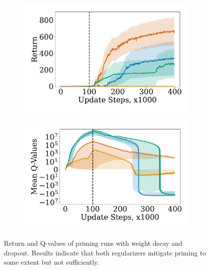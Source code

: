 \begin{figure}[b]
\begin{minipage}[b]{.62\textwidth}
    \begin{subfigure}[b]{0.5\textwidth}
        \centering
        \includegraphics[width=\textwidth]{figures/dissecting/priming/priming_ablations_return.pdf}
    \end{subfigure}%
    \begin{subfigure}[b]{0.5\textwidth}
    \centering
        \includegraphics[width=\textwidth]{figures/dissecting/priming/priming_ablations_Q.pdf}
    \end{subfigure}%
    \caption{Return and
    Q-values of priming runs with weight decay and dropout. Results indicate that both regularizers mitigate priming to some extent but not sufficiently. }
    \label{fig:overestimation:priming_abl}
\end{minipage}
\end{figure}


